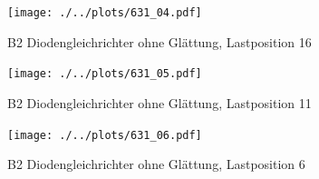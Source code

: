 \begin{figure}[h!]
    \centering
    \texttt{[image: ./../plots/631\_04.pdf]}
    \caption{B2 Diodengleichrichter ohne Glättung, Lastposition 16}
    \label{fig:b2_diode_l16}
\end{figure}

\begin{figure}[h!]
    \centering
    \texttt{[image: ./../plots/631\_05.pdf]}
    \caption{B2 Diodengleichrichter ohne Glättung, Lastposition 11}
    \label{fig:b2_diode_l11}
\end{figure}

\begin{figure}[h!]
    \centering
    \texttt{[image: ./../plots/631\_06.pdf]}
    \caption{B2 Diodengleichrichter ohne Glättung, Lastposition 6}
    \label{fig:b2_diode_l6}
\end{figure}


\clearpage
